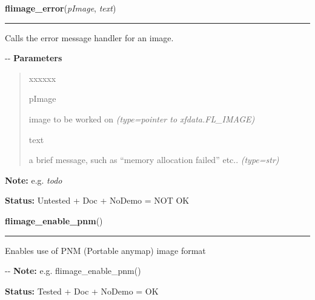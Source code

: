     \label{xformslib:flflimage:flimage_error}

    \vspace{0.5ex}

\hspace{.8\funcindent}\begin{boxedminipage}{\funcwidth}

    \raggedright \textbf{flimage\_error}(\textit{pImage}, \textit{text})

    \vspace{-1.5ex}

    \rule{\textwidth}{0.5\fboxrule}
\setlength{\parskip}{2ex}

Calls the error message handler for an image.

-{}-
\setlength{\parskip}{1ex}
      \textbf{Parameters}
      \vspace{-1ex}

      \begin{quote}
        \begin{Ventry}{xxxxxx}

          \item[pImage]


image to be worked on
            {\it (type=pointer to xfdata.FL\_IMAGE)}

          \item[text]


a brief message, such as ``memory allocation failed'' etc..
            {\it (type=str)}

        \end{Ventry}

      \end{quote}

\textbf{Note:} 
e.g. \emph{todo}


\textbf{Status:} 
Untested + Doc + NoDemo = NOT OK


    \end{boxedminipage}

    \label{xformslib:flflimage:flimage_enable_pnm}

    \vspace{0.5ex}

\hspace{.8\funcindent}\begin{boxedminipage}{\funcwidth}

    \raggedright \textbf{flimage\_enable\_pnm}()

    \vspace{-1.5ex}

    \rule{\textwidth}{0.5\fboxrule}
\setlength{\parskip}{2ex}

Enables use of PNM (Portable anymap) image format

-{}-
\setlength{\parskip}{1ex}
\textbf{Note:} 
e.g. flimage\_enable\_pnm()


\textbf{Status:} 
Tested + Doc + NoDemo = OK


    \end{boxedminipage}

